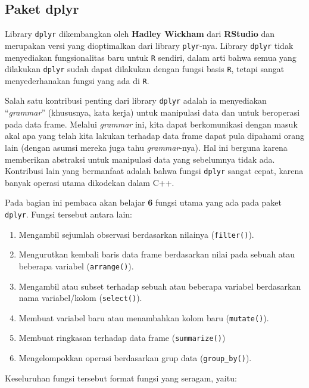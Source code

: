 \documentclass[]{book}
\providecommand{\tightlist}{%
  \setlength{\itemsep}{0pt}\setlength{\parskip}{0pt}}
\begin{document}
\subsection{Paket dplyr}\label{paket-dplyr}

Library \texttt{dplyr} dikembangkan oleh \textbf{Hadley Wickham} dari
\textbf{RStudio} dan merupakan versi yang dioptimalkan dari library
\texttt{plyr}-nya. Library \texttt{dplyr} tidak menyediakan
fungsionalitas baru untuk \texttt{R} sendiri, dalam arti bahwa semua
yang dilakukan \texttt{dplyr} sudah dapat dilakukan dengan fungsi basis
\texttt{R}, tetapi sangat menyederhanakan fungsi yang ada di \texttt{R}.

Salah satu kontribusi penting dari library \texttt{dplyr} adalah ia
menyediakan ``\emph{grammar}'' (khususnya, kata kerja) untuk manipulasi
data dan untuk beroperasi pada data frame. Melalui \emph{grammar} ini,
kita dapat berkomunikasi dengan masuk akal apa yang telah kita lakukan
terhadap data frame dapat pula dipahami orang lain (dengan asumsi mereka
juga tahu \emph{grammar}-nya). Hal ini berguna karena memberikan
abstraksi untuk manipulasi data yang sebelumnya tidak ada. Kontribusi
lain yang bermanfaat adalah bahwa fungsi \texttt{dplyr} sangat cepat,
karena banyak operasi utama dikodekan dalam C++.

Pada bagian ini pembaca akan belajar \textbf{6} fungsi utama yang ada
pada paket \texttt{dplyr}. Fungsi tersebut antara lain:

\begin{enumerate}
\def\labelenumi{\arabic{enumi}.}
\tightlist
\item
  Mengambil sejumlah observasi berdasarkan nilainya (\texttt{filter()}).
\item
  Mengurutkan kembali baris data frame berdasarkan nilai pada sebuah
  atau beberapa variabel (\texttt{arrange()}).
\item
  Mengambil atau subset terhadap sebuah atau beberapa variabel
  berdasarkan nama variabel/kolom (\texttt{select()}).
\item
  Membuat variabel baru atau menambahkan kolom baru (\texttt{mutate()}).
\item
  Membuat ringkasan terhadap data frame (\texttt{summarize()})
\item
  Mengelompokkan operasi berdasarkan grup data (\texttt{group\_by()}).
\end{enumerate}

Keseluruhan fungsi tersebut format fungsi yang seragam, yaitu:
\end{document}
